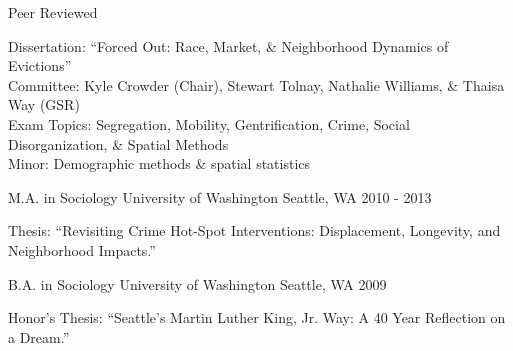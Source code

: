 

\begin{cventries}

  \cventry
    {} %
    {Peer Reviewed} %
    {} %
    {} %
    {
      \begin{cvitems} %
        {Dissertation: “Forced Out: Race, Market, \& Neighborhood Dynamics of Evictions”}\\ %
        {Committee: Kyle Crowder (Chair), Stewart Tolnay, Nathalie Williams, \& Thaisa Way (GSR)}\\
        {Exam Topics: Segregation, Mobility, Gentrification, Crime, Social Disorganization, \& Spatial Methods}\\
        {Minor: Demographic methods \& spatial statistics}
      \end{cvitems}
    }

  \cventry
    {M.A. in Sociology} %
    {University of Washington} %
    {Seattle, WA} %
    {2010 - 2013} %
    {
      \begin{cvitems} %
        {Thesis: “Revisiting Crime Hot-Spot Interventions: Displacement, Longevity, and Neighborhood Impacts.”}
      \end{cvitems}
    }

  \cventry
    {B.A. in Sociology} %
    {University of Washington} %
    {Seattle, WA} %
    {2009} %
    {
      \begin{cvitems} %
        {Honor’s Thesis: “Seattle’s Martin Luther King, Jr. Way: A 40 Year Reflection on a Dream.”}
      \end{cvitems}
    }

\end{cventries}
